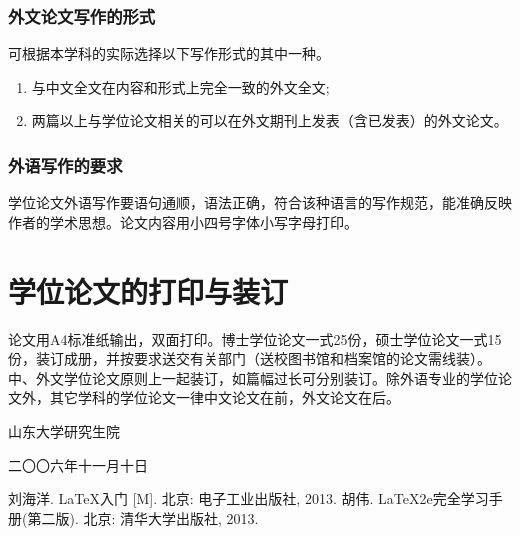 \documentclass[openany]{sduthesis} %
\begin{document}
\subsubsection{外文论文写作的形式}
可根据本学科的实际选择以下写作形式的其中一种。
\begin{enumerate}
\item 与中文全文在内容和形式上完全一致的外文全文;
\item 两篇以上与学位论文相关的可以在外文期刊上发表（含已发表）的外文论文。
\end{enumerate}
\subsubsection{外语写作的要求}
学位论文外语写作要语句通顺，语法正确，符合该种语言的写作规范，能准确反映作者的学术思想。论文内容用小四号字体小写字母打印。
\section{学位论文的打印与装订}
论文用A4标准纸输出，双面打印。博士学位论文一式25份，硕士学位论文一式15份，装订成册，并按要求送交有关部门（送校图书馆和档案馆的论文需线装）。中、外文学位论文原则上一起装订，如篇幅过长可分别装订。除外语专业的学位论文外，其它学科的学位论文一律中文论文在前，外文论文在后。
\vfill
\hfill\begin{minipage}{.3\textwidth}
山东大学研究生院

二〇〇六年十一月十日
\end{minipage}
\begin{thebibliography}{1}
 刘海洋. \LaTeX 入门 [M]. 北京: 电子工业出版社, 2013.
  胡伟. \LaTeX 2e完全学习手册(第二版). 北京: 清华大学出版社, 2013.
\end{thebibliography}
  

\end{document}

